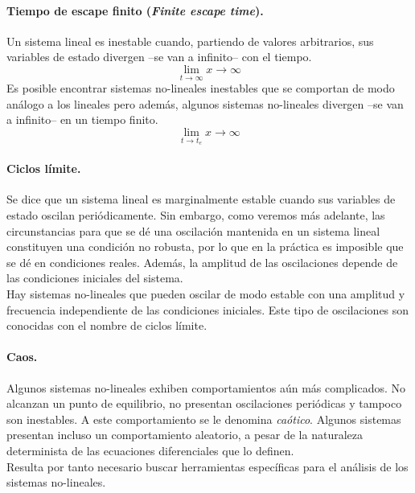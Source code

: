 \paragraph{Tiempo de escape finito (\emph{Finite escape time}).} Un sistema lineal es inestable cuando, partiendo de valores arbitrarios, sus variables de estado divergen --se van a infinito-- con el tiempo.
\begin{equation}
\lim_{ t \to \infty} x \to \infty
\end{equation}
Es posible encontrar sistemas no-lineales inestables que se comportan de modo análogo a los lineales pero además, algunos sistemas no-lineales divergen --se van a infinito-- en un tiempo finito. 
\begin{equation}
\lim_{ t \to t_e} x \to \infty
\end{equation}

\paragraph{Ciclos límite.} Se dice que un sistema lineal es marginalmente estable cuando sus variables de estado oscilan periódicamente. Sin embargo, como veremos más adelante, las circunstancias para que se dé una oscilación mantenida en un sistema lineal constituyen una condición no robusta, por lo que en la práctica es imposible que se dé en condiciones reales. Además, la amplitud de las oscilaciones depende de las condiciones iniciales del sistema.\\

Hay sistemas no-lineales que pueden oscilar de modo estable con una amplitud y frecuencia independiente de las condiciones iniciales. Este tipo de oscilaciones son conocidas con el nombre de ciclos límite. 

\paragraph{Caos.} Algunos sistemas no-lineales exhiben comportamientos aún más complicados. No alcanzan un punto de equilibrio, no presentan oscilaciones periódicas y tampoco son inestables. A este comportamiento se le denomina \emph{caótico}. Algunos sistemas presentan incluso un comportamiento aleatorio, a pesar de la naturaleza determinista de las ecuaciones diferenciales que lo definen.\\


 Resulta por tanto necesario buscar herramientas específicas para el análisis de los sistemas no-lineales.
